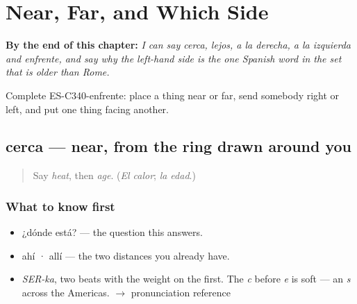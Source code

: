 
\chapter{Near, Far, and Which Side}
\label{ch:cerca-y-lejos}

\begin{chapteropening}
\textbf{By the end of this chapter:} \emph{I can say cerca, lejos, a la derecha, a la izquierda and enfrente, and say why the left-hand side is the one Spanish word in the set that is older than Rome.}

Complete ES-C340-enfrente: place a thing near or far, send somebody right or left, and put one thing facing another.
\end{chapteropening}

\section[cerca]{cerca — near, from the ring drawn around you}

\label{lesson:ES-C340-cerca}



\begin{quote}
Say \emph{heat}, then \emph{age}. (\emph{El calor}; \emph{la edad}.)
\end{quote}

\subsection*{What to know first}
\begin{itemize}
\raggedright
  \item ¿dónde está? — the question this answers.
  \item ahí · allí — the two distances you already have.
\end{itemize}

\begin{sounds}
\begin{itemize}
\raggedright
  \item \emph{SER-ka}, two beats with the weight on the first. The \emph{c} before \emph{e} is soft — an \emph{s} across the Americas. $\to$ pronunciation reference
\end{itemize}
\end{sounds}

